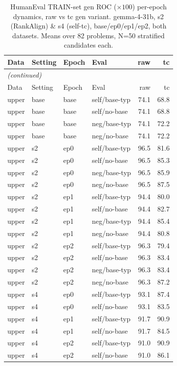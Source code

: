 {\small
\begin{longtable}{llll rr}
\caption{HumanEval TRAIN-set gen ROC ($\times100$) per-epoch dynamics, raw vs tc gen variant. gemma-4-31b, s2 (RankAlign) \& s4 (self-tc), base/ep0/ep1/ep2, both datasets. Means over 82 problems, N=50 stratified candidates each.}\label{tab:he_train_gen_roc}\\
\toprule
Data & Setting & Epoch & Eval & raw & tc \\
\midrule
\endfirsthead
\multicolumn{6}{l}{\itshape (continued)}\\
\toprule
Data & Setting & Epoch & Eval & raw & tc \\
\midrule
\endhead
\bottomrule
\endfoot
upper & base & base & self/base-typ & 74.1 & 68.8 \\
upper & base & base & self/no-base & 74.1 & 68.8 \\
upper & base & base & neg/base-typ & 74.1 & 72.2 \\
upper & base & base & neg/no-base & 74.1 & 72.2 \\
upper & s2 & ep0 & self/base-typ & 96.5 & 81.6 \\
upper & s2 & ep0 & self/no-base & 96.5 & 85.3 \\
upper & s2 & ep0 & neg/base-typ & 96.5 & 85.9 \\
upper & s2 & ep0 & neg/no-base & 96.5 & 87.5 \\
upper & s2 & ep1 & self/base-typ & 94.4 & 80.0 \\
upper & s2 & ep1 & self/no-base & 94.4 & 82.7 \\
upper & s2 & ep1 & neg/base-typ & 94.4 & 85.4 \\
upper & s2 & ep1 & neg/no-base & 94.4 & 80.8 \\
upper & s2 & ep2 & self/base-typ & 96.3 & 79.4 \\
upper & s2 & ep2 & self/no-base & 96.3 & 83.4 \\
upper & s2 & ep2 & neg/base-typ & 96.3 & 83.4 \\
upper & s2 & ep2 & neg/no-base & 96.3 & 87.2 \\
upper & s4 & ep0 & self/base-typ & 93.1 & 87.4 \\
upper & s4 & ep0 & self/no-base & 93.1 & 83.5 \\
upper & s4 & ep1 & self/base-typ & 91.7 & 90.9 \\
upper & s4 & ep1 & self/no-base & 91.7 & 84.5 \\
upper & s4 & ep2 & self/base-typ & 91.0 & 90.9 \\
upper & s4 & ep2 & self/no-base & 91.0 & 86.1 \\

\end{longtable}}
